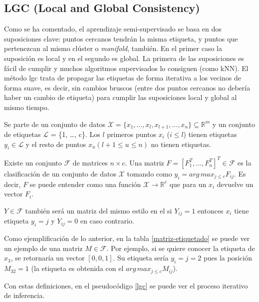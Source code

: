 \subsection{LGC (Local and Global Consistency)}
\label{teoria-lgc}

Como se ha comentado, el aprendizaje semi-supervisado se basa en dos suposiciones clave: puntos cercanos tendrán la misma etiqueta, y puntos que pertenezcan al mismo clúster o \textit{manifold}, también. En el primer caso la suposición es local y en el segundo es global. La primera de las suposiciones es fácil de cumplir y muchos algoritmos supervisados lo consiguen (como kNN). El método \Gls{lgc} \cite{zhou2003learning} trata de propagar las etiquetas de forma iterativa a los vecinos de forma suave, es decir, sin cambios bruscos (entre dos puntos cercanos no debería haber un cambio de etiqueta) para cumplir las suposiciones local y global al mismo tiempo.

Se parte de un conjunto de datos $\mathcal{X} = \{x_1, \ldots, x_l, x_{l+1}, \ldots, x_n\} \subseteq \mathbb{R}^m$ y un conjunto de etiquetas $\mathcal{L}$ = \{1, \ldots, c\}. Los $l$ primeros puntos $x_i$ ($i \leq l$) tienen etiquetas $y_i \in \mathcal{L}$ y el resto de puntos $x_u (l+1 \leq u \leq n)$ no tienen etiquetas.

Existe un conjunto $\mathcal{F}$ de matrices $n \times c$. Una matriz $F = [F^T_1, \ldots, F^T_n]^T \in \mathcal{F}$ es la clasificación de un conjunto de datos $\mathcal{X}$ tomando como $y_i = arg\,max_{j \leq c} F_{ij}$. Es decir, $F$ se puede entender como una función $\mathcal{X} \xrightarrow{} \mathbb{R}^c$ que para un $x_i$ devuelve un vector $F_i$.

$Y \in \mathcal{F}$ también será un matriz del mismo estilo en el si $Y_{ij} = 1$ entonces $x_i$ tiene etiqueta $y_i = j$ y $Y_{ij} = 0$ en caso contrario. 

Como ejemplificación de lo anterior, en la tabla \ref{matriz-etiquetado} se puede ver un ejemplo de una matriz $M \in \mathcal{F}$. Por ejemplo, si se quiere conocer la etiqueta de $x_3$, se retornaría un vector $[0,0,1]$. Su etiqueta sería $y_i = j = 2$ pues la posición $M_{32} = 1$ (la etiqueta es obtenida con el $arg\,max_{j \leq c} M_{ij}$). 

Con estas definiciones, en el pseudocódigo \ref{lgc} se puede ver el proceso iterativo de inferencia.

